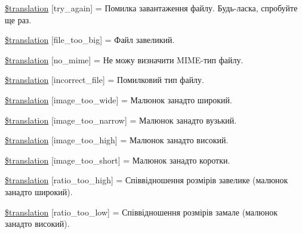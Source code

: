 \begin{DoxyCompactItemize}
\item 
\hyperlink{class_8upload_8uk___u_a_8php_a3afc377bd803683314f413a814243066}{\$translation} \mbox{[}\textquotesingle{}try\+\_\+again\textquotesingle{}\mbox{]} = \textquotesingle{}Помилка завантаження файлу. Будь-\/ласка, спробуйте ще раз.\textquotesingle{}
\item 
\hyperlink{class_8upload_8uk___u_a_8php_a476278eb4a0c3df56af068e2d511a741}{\$translation} \mbox{[}\textquotesingle{}file\+\_\+too\+\_\+big\textquotesingle{}\mbox{]} = \textquotesingle{}Файл завеликий.\textquotesingle{}
\item 
\hyperlink{class_8upload_8uk___u_a_8php_a191a55df8e3bb7f3c51b70f3c1932e02}{\$translation} \mbox{[}\textquotesingle{}no\+\_\+mime\textquotesingle{}\mbox{]} = \textquotesingle{}Не можу визначити M\+I\+M\+E-\/тип файлу.\textquotesingle{}
\item 
\hyperlink{class_8upload_8uk___u_a_8php_a4d32343e2699edd6fd435f9c832cb9c7}{\$translation} \mbox{[}\textquotesingle{}incorrect\+\_\+file\textquotesingle{}\mbox{]} = \textquotesingle{}Помилковий тип файлу.\textquotesingle{}
\item 
\hyperlink{class_8upload_8uk___u_a_8php_a0dd3e4930ca1f59ae280f4b1006525cd}{\$translation} \mbox{[}\textquotesingle{}image\+\_\+too\+\_\+wide\textquotesingle{}\mbox{]} = \textquotesingle{}Малюнок занадто широкий.\textquotesingle{}
\item 
\hyperlink{class_8upload_8uk___u_a_8php_a5c9a4cd67fd21c32e0a3b434591a6037}{\$translation} \mbox{[}\textquotesingle{}image\+\_\+too\+\_\+narrow\textquotesingle{}\mbox{]} = \textquotesingle{}Малюнок занадто вузький.\textquotesingle{}
\item 
\hyperlink{class_8upload_8uk___u_a_8php_aa27bde361343f3b63c7cd441860024f8}{\$translation} \mbox{[}\textquotesingle{}image\+\_\+too\+\_\+high\textquotesingle{}\mbox{]} = \textquotesingle{}Малюнок занадто високий.\textquotesingle{}
\item 
\hyperlink{class_8upload_8uk___u_a_8php_a86fcd4e1157b00032df451188d735527}{\$translation} \mbox{[}\textquotesingle{}image\+\_\+too\+\_\+short\textquotesingle{}\mbox{]} = \textquotesingle{}Малюнок занадто коротки.\textquotesingle{}
\item 
\hyperlink{class_8upload_8uk___u_a_8php_a23396f6ce7f31e5e5f1b57580621d982}{\$translation} \mbox{[}\textquotesingle{}ratio\+\_\+too\+\_\+high\textquotesingle{}\mbox{]} = \textquotesingle{}Співвідношення розмірів завелике (малюнок занадто широкий).\textquotesingle{}
\item 
\hyperlink{class_8upload_8uk___u_a_8php_ac533b9a479f056b0b8623e4268f068c2}{\$translation} \mbox{[}\textquotesingle{}ratio\+\_\+too\+\_\+low\textquotesingle{}\mbox{]} = \textquotesingle{}Співвідношення розмірів замале (малюнок занадто високий).\textquotesingle{}

\end{DoxyCompactItemize}
